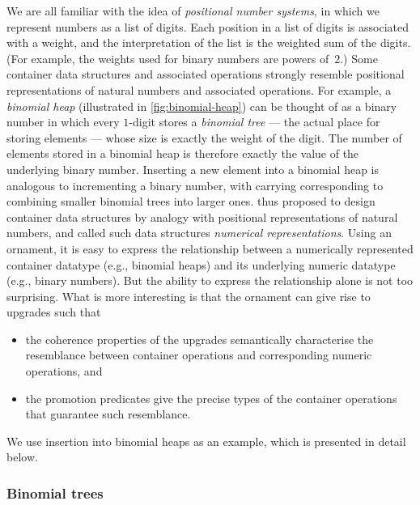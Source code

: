We are all familiar with the idea of \emph{positional number systems}, in which we represent numbers as a list of digits.
Each position in a list of digits is associated with a weight, and the interpretation of the list is the weighted sum of the digits.
(For example, the weights used for binary numbers are powers of~$2$.)
Some container data structures and associated operations strongly resemble positional representations of natural numbers and associated operations.
For example, a \emph{binomial heap} (illustrated in \autoref{fig:binomial-heap}) can be thought of as a binary number in which every $1$-digit stores a \emph{binomial tree} --- the actual place for storing elements --- whose size is exactly the weight of the digit.
The number of elements stored in a binomial heap is therefore exactly the value of the underlying binary number.
Inserting a new element into a binomial heap is analogous to incrementing a binary number, with carrying corresponding to combining smaller binomial trees into larger ones.
\citeauthor{Okasaki-data-structures} thus proposed to design container data structures by analogy with positional representations of natural numbers, and called such data structures \emph{numerical representations}.
Using an ornament, it is easy to express the relationship between a numerically represented container datatype (e.g., binomial heaps) and its underlying numeric datatype (e.g., binary numbers).
But the ability to express the relationship alone is not too surprising.
What is more interesting is that the ornament can give rise to upgrades such that
\begin{itemize}
\item the coherence properties of the upgrades semantically characterise the resemblance between container operations and corresponding numeric operations, and
\item the promotion predicates give the precise types of the container operations that guarantee such resemblance.
\end{itemize}
We use insertion into binomial heaps as an example, which is presented in detail below.

\subsubsection{Binomial trees}

